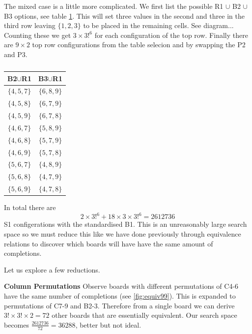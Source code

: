 \documentclass[a4paper,11pt]{report}
\newcounter{row}
\begin{document}
The mixed case is a little more complicated. We first list the possible R1 $\cup$ B2 $\cup$ B3 options, see table \ref{table:mixed99}. This will set three values in the second and three in the third row leaving $\{1,2,3\}$ to be placed in the remaining cells. See diagram... Counting these we get $3\times3!^6$ for each configuration of the top row. Finally there are $9\times 2$ top row configurations from the table selecion and by swapping the P2 and P3. 

\begin{table}[!h]
\begin{center}
\begin{tabular}{ |c|c| }
 \hline
B2$\cup$R1  & B3$\cup$R1\\
 \hline
$\{4,5,7\}$&$\{6,8,9\}$\\
$\{4,5,8\}$&$\{6,7,9\}$\\
$\{4,5,9\}$&$\{6,7,8\}$\\
$\{4,6,7\}$&$\{5,8,9\}$\\
$\{4,6,8\}$&$\{5,7,9\}$\\
$\{4,6,9\}$&$\{5,7,8\}$\\
$\{5,6,7\}$&$\{4,8,9\}$\\
$\{5,6,8\}$&$\{4,7,9\}$\\
$\{5,6,9\}$&$\{4,7,8\}$\\
\hline
\end{tabular}
\end{center}
\caption{\label{table:mixed99}}
\end{table}

In total there are
\begin{equation}2\times3!^6+18\times 3\times 3!^6 = 2612736\end{equation}
S1 configerations with the standardised B1. This is an unreasonably large search space so we must reduce this like we have done previously through equivalence relations to discover which boards will have have the same amount of completions. 

Let us explore a few reductions.

\textbf{Column Permutations}
Observe boards with different permutations of C4-6 have the same number of completions (see \ref{fig:equiv99}). This is expanded to permutations of C7-9 and B2-3. Therefore from a single board we can derive $3!\times3!\times2=72$ other boards that are essentially equivalent. Our search space becomes $\frac{2612736}{72}=36288$, better but not ideal.
\end{document}
